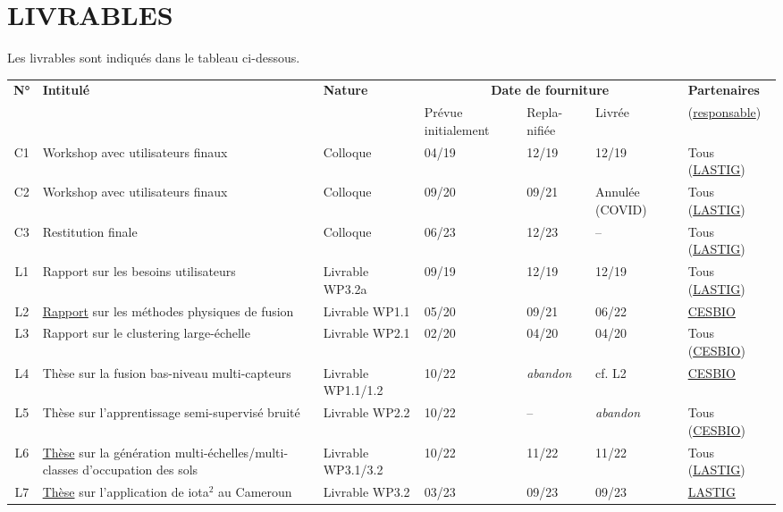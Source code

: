 \section{LIVRABLES}
\label{sec:livrables}
Les livrables sont indiqués dans le tableau ci-dessous.
\begin{table}[h!]
\small
    \centering
    \begin{tabular}{|c|p{4.55cm}|p{1.75cm}|p{1.25cm}|p{1.35cm}|p{1.35cm}|p{2.55cm}|}
    \hline
\multirow{2}{*}{\textbf{N°}} & \multirow{2}{*}{\textbf{Intitulé}} & \multirow{2}{*}{\textbf{Nature}} & \multicolumn{3}{|c|}{\textbf{Date de fourniture}} & \textbf{Partenaires}\\\cline{4-6}
 & & & Prévue initialement & Repla-nifiée & Livrée & (\underline{responsable}) \\
\hline

C1 &Workshop avec utilisateurs finaux & Colloque  &04/19 &12/19 &12/19 & Tous (\underline{LASTIG}) \\
\hline
C2 &Workshop avec utilisateurs finaux & Colloque  &09/20 &09/21 &Annulée (COVID) & Tous (\underline{LASTIG}) \\
\hline
C3 &Restitution finale & Colloque  & 06/23 &12/23 & --& Tous (\underline{LASTIG}) \\
\hline \hline
L1 & Rapport sur les besoins utilisateurs & Livrable WP3.2a  &09/19 & 12/19 & 12/19 & Tous (\underline{LASTIG}) \\
\hline
L2 & \href{https://ieeexplore.ieee.org/document/10156821}{Rapport} sur les méthodes physiques de fusion & Livrable WP1.1  &05/20 &09/21 & 06/22 & \underline{CESBIO} \\
\hline
L3 & Rapport sur le clustering large-échelle & Livrable WP2.1  &02/20 & 04/20 & 04/20 & Tous (\underline{CESBIO}) \\
\hline
L4 & Thèse sur la fusion bas-niveau multi-capteurs & Livrable WP1.1/1.2  &10/22 & \textit{abandon}& cf. L2 & \underline{CESBIO} \\
\hline
L5 & Thèse sur l'apprentissage semi-supervisé bruité & Livrable WP2.2  &10/22 & -- & \textit{abandon} & Tous (\underline{CESBIO}) \\
\hline
L6 & \href{https://www.theses.fr/2023UEFL2007}{Thèse} sur la génération multi-échelles/multi-classes d'occupation des sols & Livrable WP3.1/3.2  &10/22 & 11/22 & 11/22 & Tous (\underline{LASTIG}) \\
\hline
L7& \href{https://www.theses.fr/s211949}{Thèse} sur l'application de iota$^2$ au Cameroun & Livrable WP3.2  &03/23 & 09/23 & 09/23 & \underline{LASTIG} \\
\hline
    \end{tabular}
    \label{tab:livrables}
\end{table}